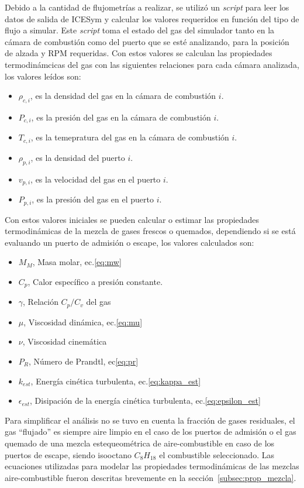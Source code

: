 Debido a la cantidad de flujometrías a realizar, se utilizó un \emph{script} para leer
los datos de salida de ICESym y calcular los valores requeridos en función del
tipo de flujo a simular.
%
Este \emph{script} toma el estado del gas del simulador tanto en la cámara de
combustión como del puerto que se esté analizando, para la posición de alzada y
RPM requeridas.
%
Con estos valores se calculan las propiedades termodinámcicas del gas con las
siguientes relaciones para cada cámara analizada, los valores leídos son:

\begin{itemize}
    \item $\rho_{c,i}$, es la densidad del gas en la cámara de combustión $i$.
    \item $P_{c,i}$, es la presión del gas en la cámara de combustión $i$.
    \item $T_{c,i}$, es la temepratura del gas en la cámara de combustión $i$.
    \item $\rho_{p,i}$, es la densidad del puerto $i$.
    \item $v_{p,i}$, es la velocidad del gas en el puerto $i$.
    \item $P_{p,i}$, es la presión del gas en el puerto $i$.
\end{itemize}

Con estos valores iniciales se pueden calcular o estimar las propiedades
termodinámicas de la mezcla de gases frescos o quemados, dependiendo si se está
evaluando un puerto de admisión o escape, los valores calculados son:
%
\begin{itemize}
    \item $M_{M}$, Masa molar, ec.\ref{eq:mw}
    \item $C_{p}$, Calor específico a presión constante.
    \item $\gamma$, Relación $C_{p}/C_{v}$ del gas
    \item $\mu$, Viscosidad dinámica, ec.\ref{eq:mu}
    \item $\nu$, Viscosidad cinemática
    \item $P_{R}$, Número de Prandtl, ec\ref{eq:pr}
    \item $k_{est}$, Energía cinética turbulenta, ec.\ref{eq:kappa_est}
    \item $\epsilon_{est}$, Disipación de la energía cinética turbulenta, ec.\ref{eq:epsilon_est}
\end{itemize}

Para simplificar el análisis no se tuvo en cuenta la fracción de gases
residuales, el gas ``flujado'' es siempre aire limpio en el caso de los puertos
de admisión o el gas quemado de una mezcla estequeométrica de aire-combustible
en caso de los puertos de escape, siendo isooctano $C_{8}H_{18}$ el combustible
seleccionado.
%
Las ecuaciones utilizadas para modelar las propiedades termodinámicas de las
mezclas aire-combustible fueron descritas brevemente en la
sección~\ref{subsec:prop_mezcla}.

